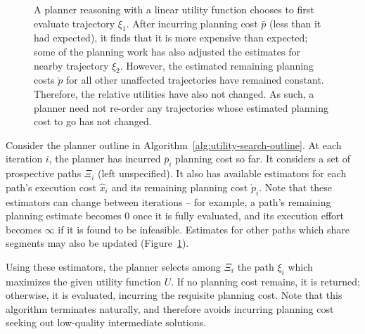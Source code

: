 \begin{figure}
   \centering
   \quad%
   \caption{A planner reasoning with a linear utility function
      chooses to first evaluate trajectory $\xi_1$.
      After incurring planning cost $\bar{p}$
      (less than it had expected),
      it finds that it is more expensive than expected;
      some of the planning work has also adjusted the estimates
      for nearby trajectory $\xi_2$.
      However,
      the estimated remaining planning costs $\grave{p}$
      for all other unaffected trajectories have remained constant.
      Therefore, the relative utilities have also not changed.
      As such, a planner need not re-order any trajectories whose
      estimated planning cost to go has not changed.
      }
   \label{fig:pvx-linear-discounting}
\end{figure}

Consider the planner outline in
Algorithm~\ref{alg:utility-search-outline}.
At each iteration $i$,
the planner has incurred $\bar{p}_i$ planning cost so far.
It considers a set of prospective paths $\Xi_i$
(left unspecified).
It also has available estimators for each path's execution cost
$\hat{x}_i$
and its remaining planning cost
$\grave{p}_i$.
Note that these estimators can change between iterations --
for example,
a path's remaining planning estimate becomes 0 once it is
fully evaluated,
and its execution effort becomes $\infty$ if it is found to be
infeasible.
Estimates for other paths which share segments may also be
updated (Figure~\ref{fig:pvx-linear-discounting}).

Using these estimators,
the planner selects among $\Xi_i$
the path $\xi_i$ which maximizes the given utility function $U$.
If no planning cost remains, it is returned;
otherwise,
it is evaluated,
incurring the requisite planning cost.
Note that this algorithm terminates naturally,
and therefore avoids incurring planning cost seeking out
low-quality intermediate solutions.

